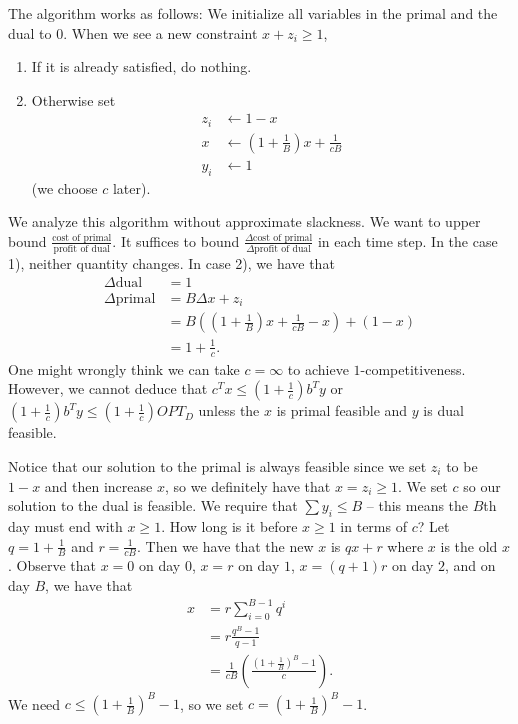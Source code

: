 \documentclass[11pt]{article}
\begin{document}
The algorithm works as follows:
We initialize all variables in the primal and the dual to $0$. When we see a new constraint $x + z_i \ge 1$,
\begin{enumerate}
\item{If it is already satisfied, do nothing.}
\item{Otherwise set
\begin{align*}
z_i &\leftarrow 1-x \\ 
x &\leftarrow \left(1+\frac{1}{B}\right)x + \frac{1}{cB} \\
y_i &\leftarrow 1
\end{align*}
(we choose $c$ later).
}
\end{enumerate}
We analyze this algorithm without approximate slackness. We want to upper bound $\frac{\text{cost of primal}}{\text{profit of dual}}$. It suffices to bound $\frac{\Delta\text{cost of primal}}{\Delta\text{profit of dual}}$ in each time step. In the case 1), neither quantity changes. In case 2), we have that 
\begin{align*}
\Delta \text{dual} &= 1\\
\Delta \text{primal} &= B \Delta x + z_i \\
&= B\left(\left(1 + \frac{1}{B}\right)x + \frac{1}{cB} - x\right) + (1-x) \\
&= 1 + \frac{1}{c}.
\end{align*}  
One might wrongly think we can take $c = \infty$ to achieve $1$-competitiveness. However, we cannot deduce that $c^Tx \le \left(1+\frac{1}{c}\right)b^T y$ or $\left(1+\frac{1}{c}\right)b^T y \le \left(1+\frac{1}{c}\right) OPT_D$ unless the $x$ is primal feasible and $y$ is dual feasible. 

Notice that our solution to the primal is always feasible since we set $z_i$ to be $1-x$ and then increase $x$, so we definitely have that $x = z_i \ge 1$. We set $c$ so our solution to the dual is feasible. We require that $\sum y_i \le B$ -- this means the $B$th day must end with $x \ge 1$. How long is it before $x \ge 1$ in terms of $c$? Let $q = 1+ \frac{1}{B}$ and $r = \frac{1}{cB}$. Then we have that the new $x$ is $qx + r$ where $x$ is the old $x$. Observe that $x=0$ on day $0$, $x=r$ on day $1$, $x = (q+1)r$ on day $2$, and on day $B$, we have that
\begin{align*}
x &= r \sum_{i=0}^{B-1} q^i \\
&= r \frac{q^B-1}{q-1}\\
&= \frac{1}{cB} \left(\frac{ \left(1 + \frac{1}{B} \right)^B - 1}{c} \right).
\end{align*}
We need $c \le \left(1 + \frac{1}{B} \right)^B - 1$, so we set $c = \left(1 + \frac{1}{B} \right)^B - 1$. 
\end{document}
